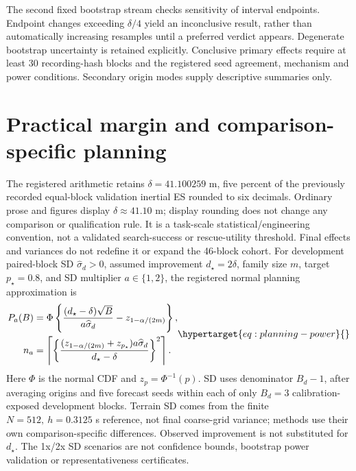 The second fixed bootstrap stream checks sensitivity of interval endpoints.
Endpoint changes exceeding \(\delta/4\) yield an inconclusive result, rather
than automatically increasing resamples until a preferred verdict appears.
Degenerate bootstrap uncertainty is retained explicitly. Conclusive primary
effects require at least 30 recording-hash blocks and the registered seed
agreement, mechanism and power conditions. Secondary origin modes supply
descriptive summaries only.


\section{Practical margin and comparison-specific planning}
\label{sec:planning-qualification}\hypertarget{sec:planning-qualification}{}
The registered arithmetic retains \(\delta=41.100259\) m, five percent of
the previously recorded equal-block validation inertial ES rounded to six
decimals. Ordinary prose and figures display \(\delta\approx41.10\) m;
display rounding does not change any comparison or qualification rule.
It is a task-scale
statistical/engineering convention, not a validated search-success or rescue-utility
threshold. Final effects and variances do not redefine it or expand the 46-block cohort.
For development paired-block SD \(\widehat\sigma_d>0\), assumed improvement
\(d_\star=2\delta\), family size \(m\), target \(p_\star=0.8\), and SD
multiplier \(a\in\{1,2\}\), the registered normal planning approximation is
\begin{equation}
\begin{aligned}
 P_a(B)&=\Phi\left\{\frac{(d_\star-\delta)\sqrt B}{a\widehat\sigma_d}
                         -z_{1-\alpha/(2m)}\right\},\\
 n_a&=\left\lceil\left\{\frac{(z_{1-\alpha/(2m)}+z_{p_\star})a\widehat\sigma_d}
                              {d_\star-\delta}\right\}^{2}\right\rceil .
\end{aligned}
\label{eq:planning-power}\hypertarget{eq:planning-power}{}
\end{equation}
Here \(\Phi\) is the normal CDF and \(z_p=\Phi^{-1}(p)\). SD uses denominator
\(B_d-1\), after averaging origins and five forecast seeds within each of only
\(B_d=3\) calibration-exposed development blocks. Terrain SD comes from the
finite \(N=512,\ h=0.3125\) s reference, not final coarse-grid variance;
methods use their own comparison-specific differences. Observed improvement
is not substituted for \(d_\star\). The 1x/2x SD scenarios are not confidence
bounds, bootstrap power validation or representativeness certificates.

